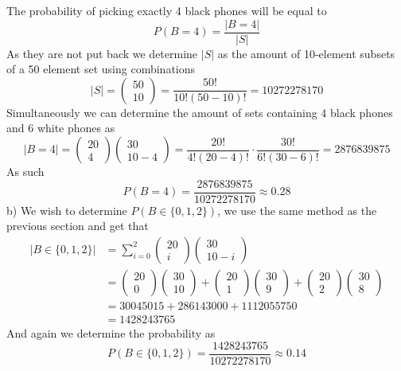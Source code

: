 The probability of picking exactly 4 black phones will be equal to
\[
    P(B=4)=\frac{|B=4|}{|S|}
\]
As they are not put back we determine $|S|$ as the amount of 10-element subsets of a 50 element set using combinations
\[
    |S|=\begin{pmatrix}50\\10\end{pmatrix}=\frac{50!}{10!(50-10)!}=10272278170
\]
Simultaneously we can determine the amount of sets containing 4 black phones and 6 white phones as
\[
    |B=4|=\begin{pmatrix}20\\4\end{pmatrix}\begin{pmatrix}30\\10-4\end{pmatrix}=\frac{20!}{4!(20-4)!}\cdot\frac{30!}{6!(30-6)!}=2876839875
\]
As such
\[
    P(B=4)=\frac{2876839875}{10272278170}\approx 0.28
\]
b)
We wish to determine $P(B\in\{0,1,2\})$, we use the same method as the previous section and get that
\begin{align*}
    |B\in\{0,1,2\}|&=\sum_{i=0}^{2} \begin{pmatrix}20\\i\end{pmatrix}\begin{pmatrix}30\\10-i\end{pmatrix} \\
              &=\begin{pmatrix}20\\0\end{pmatrix}\begin{pmatrix}30\\10\end{pmatrix}+\begin{pmatrix}20\\1\end{pmatrix}\begin{pmatrix}30\\9\end{pmatrix}+\begin{pmatrix}20\\2\end{pmatrix}\begin{pmatrix}30\\8\end{pmatrix} \\
              &=30045015+286143000+1112055750 \\
              &=1428243765
\end{align*}
And again we determine the probability as
\[
    P(B\in\{0,1,2\})=\frac{1428243765}{10272278170}\approx 0.14
\]

